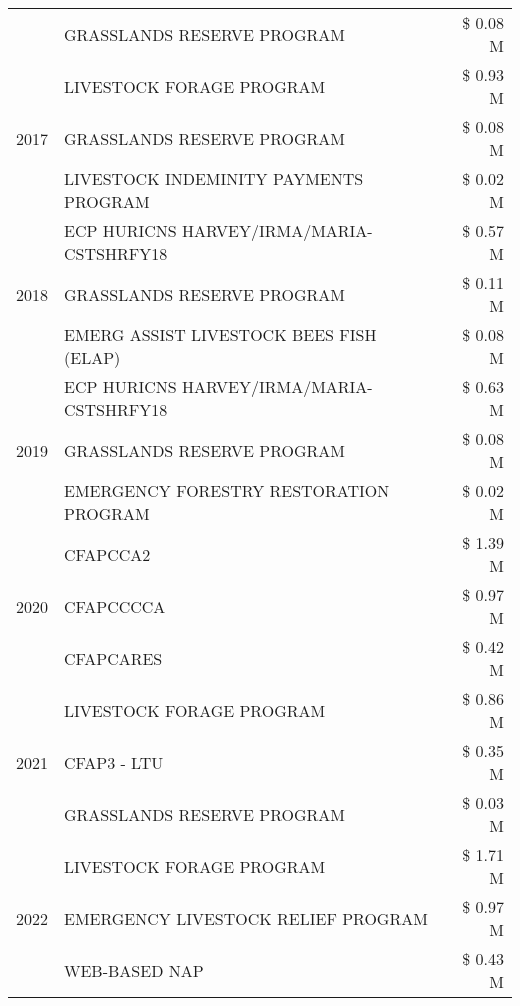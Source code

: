 \begin{tabular}{llr}
 & GRASSLANDS RESERVE PROGRAM & \$ 0.08 M \\
\cline{1-3}
\multirow[t]{3}{*}{2017} & LIVESTOCK FORAGE PROGRAM & \$ 0.93 M \\
 & GRASSLANDS RESERVE PROGRAM & \$ 0.08 M \\
 & LIVESTOCK INDEMINITY PAYMENTS PROGRAM & \$ 0.02 M \\
\cline{1-3}
\multirow[t]{3}{*}{2018} & ECP HURICNS HARVEY/IRMA/MARIA-CSTSHRFY18 & \$ 0.57 M \\
 & GRASSLANDS RESERVE PROGRAM & \$ 0.11 M \\
 & EMERG ASSIST LIVESTOCK BEES FISH (ELAP) & \$ 0.08 M \\
\cline{1-3}
\multirow[t]{3}{*}{2019} & ECP HURICNS HARVEY/IRMA/MARIA-CSTSHRFY18 & \$ 0.63 M \\
 & GRASSLANDS RESERVE PROGRAM & \$ 0.08 M \\
 & EMERGENCY FORESTRY RESTORATION PROGRAM & \$ 0.02 M \\
\cline{1-3}
\multirow[t]{3}{*}{2020} & CFAPCCA2 & \$ 1.39 M \\
 & CFAPCCCCA & \$ 0.97 M \\
 & CFAPCARES & \$ 0.42 M \\
\cline{1-3}
\multirow[t]{3}{*}{2021} & LIVESTOCK FORAGE PROGRAM & \$ 0.86 M \\
 & CFAP3 - LTU & \$ 0.35 M \\
 & GRASSLANDS RESERVE PROGRAM & \$ 0.03 M \\
\cline{1-3}
\multirow[t]{3}{*}{2022} & LIVESTOCK FORAGE PROGRAM & \$ 1.71 M \\
 & EMERGENCY LIVESTOCK RELIEF PROGRAM & \$ 0.97 M \\
 & WEB-BASED NAP & \$ 0.43 M \\
\cline{1-3}
\bottomrule
\end{tabular}
